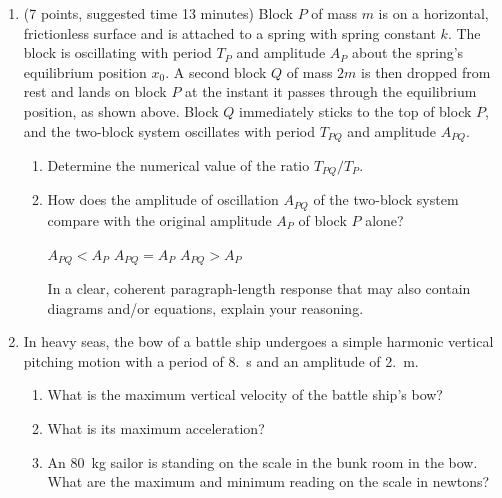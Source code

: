 \documentclass{../../../oss-apphys}
\begin{document}
\begin{center}
\end{center}
\begin{enumerate}[leftmargin=15pt]
\item (7 points, suggested time 13 minutes) Block $P$ of mass $m$ is on a
  horizontal, frictionless surface and is attached to a spring with spring
  constant $k$. The block is oscillating with period $T_P$ and amplitude $A_P$
  about the spring's equilibrium position $x_0$. A second block $Q$ of mass
  $2m$ is then dropped from rest and lands on block $P$ at the instant it
  passes through the equilibrium position, as shown above. Block $Q$
  immediately sticks to the top of block $P$, and the two-block system
  oscillates with period $T_{PQ}$ and amplitude $A_{PQ}$.
  \begin{enumerate}[leftmargin=18pt]
  \item Determine the numerical value of the ratio $T_{PQ}/T_P$.
    \vspace{1in}
  \item How does the amplitude of oscillation $A_{PQ}$ of the two-block system
    compare with the original amplitude $A_P$ of block $P$ alone?

    \vspace{.1in}
    \underline{\hspace{.3in}} $A_{PQ}<A_{P}$\hspace{.25in}
    \underline{\hspace{.3in}} $A_{PQ}=A_{P}$\hspace{.25in}
    \underline{\hspace{.3in}} $A_{PQ}>A_{P}$

    \vspace{.2in}In a clear, coherent paragraph-length response that may also
    contain diagrams and/or equations, explain your reasoning.
  \end{enumerate}
  \newpage
  
\item In heavy seas, the bow of a battle ship undergoes a simple harmonic
  vertical pitching motion with a period of \SI{8.}{\second} and an amplitude
  of \SI{2.}{\metre}.
  \begin{enumerate}[leftmargin=18pt]
  \item What is the maximum vertical velocity of the battle ship's bow?
  \item What is its maximum acceleration?
  \item An \SI{80}{\kilo\gram} sailor is standing on the scale in the bunk room
    in the bow. What are the maximum and minimum reading on the scale in
    newtons?
    \vspace{2.3in}
  \end{enumerate}


\end{enumerate}
\end{document}
